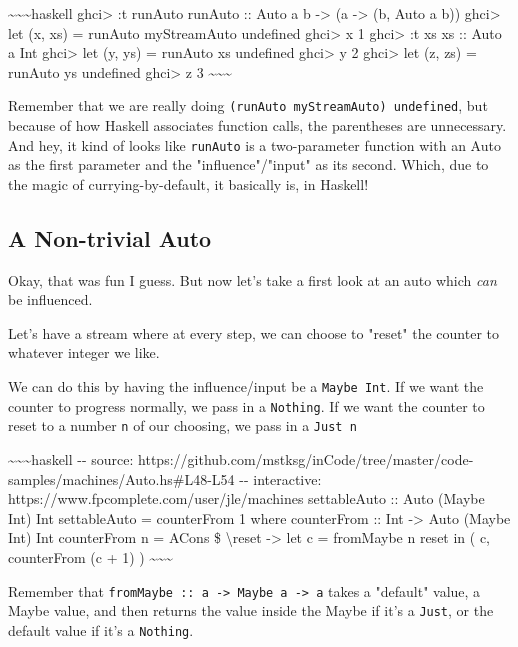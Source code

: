 \documentclass[]{article}
\begin{document}
\textasciitilde{}\textasciitilde{}\textasciitilde{}haskell ghci\textgreater{} :t
runAuto runAuto :: Auto a b -\textgreater{} (a -\textgreater{} (b, Auto a b))
ghci\textgreater{} let (x, xs) = runAuto myStreamAuto undefined
ghci\textgreater{} x 1 ghci\textgreater{} :t xs xs :: Auto a Int
ghci\textgreater{} let (y, ys) = runAuto xs undefined ghci\textgreater{} y 2
ghci\textgreater{} let (z, zs) = runAuto ys undefined ghci\textgreater{} z 3
\textasciitilde{}\textasciitilde{}\textasciitilde{}

Remember that we are really doing \texttt{(runAuto\ myStreamAuto)\ undefined},
but because of how Haskell associates function calls, the parentheses are
unnecessary. And hey, it kind of looks like \texttt{runAuto} is a two-parameter
function with an Auto as the first parameter and the "influence"/"input" as its
second. Which, due to the magic of currying-by-default, it basically is, in
Haskell!

\subsection{A Non-trivial Auto}

Okay, that was fun I guess. But now let's take a first look at an auto which
\emph{can} be influenced.

Let's have a stream where at every step, we can choose to "reset" the counter to
whatever integer we like.

We can do this by having the influence/input be a \texttt{Maybe\ Int}. If we
want the counter to progress normally, we pass in a \texttt{Nothing}. If we want
the counter to reset to a number \texttt{n} of our choosing, we pass in a
\texttt{Just\ n}

\textasciitilde{}\textasciitilde{}\textasciitilde{}haskell -\/- source:
https://github.com/mstksg/inCode/tree/master/code-samples/machines/Auto.hs\#L48-L54
-\/- interactive: https://www.fpcomplete.com/user/jle/machines settableAuto ::
Auto (Maybe Int) Int settableAuto = counterFrom 1 where counterFrom :: Int
-\textgreater{} Auto (Maybe Int) Int counterFrom n = ACons \$
\textbackslash{}reset -\textgreater{} let c = fromMaybe n reset in ( c,
counterFrom (c + 1) ) \textasciitilde{}\textasciitilde{}\textasciitilde{}

Remember that
\texttt{fromMaybe\ ::\ a\ -\textgreater{}\ Maybe\ a\ -\textgreater{}\ a} takes a
"default" value, a Maybe value, and then returns the value inside the Maybe if
it's a \texttt{Just}, or the default value if it's a \texttt{Nothing}.
\end{document}
